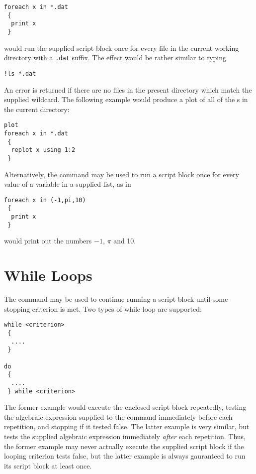 \begin{verbatim}
foreach x in *.dat
 {
  print x
 }
\end{verbatim}

\noindent would run the supplied script block once for every file in the
current working directory with a {\tt .dat} suffix. The effect would be rather
similar to typing

\begin{verbatim}
!ls *.dat
\end{verbatim}

An error is returned if there are no files in the present directory which match
the supplied wildcard. The following example would produce a plot of all of the
\datafile s in the current directory:

\begin{verbatim}
plot
foreach x in *.dat
 {
  replot x using 1:2
 }
\end{verbatim}

Alternatively, the  command may be used to run a script block
once for every value of a variable in a supplied list, as in

\begin{verbatim}
foreach x in (-1,pi,10)
 {
  print x
 }
\end{verbatim}

\noindent would print out the numbers $-1$, $\pi$ and 10.

\section{While Loops}

The  command may be used to continue running a script block
until some stopping criterion is met. Two types of while loop are supported:

\begin{verbatim}
while <criterion>
 {
  ....
 }

do
 {
  ....
 } while <criterion>
\end{verbatim}

The former example would execute the enclosed script block repeatedly, testing
the algebraic expression supplied to the  command immediately
before each repetition, and stopping if it tested false. The latter example is
very similar, but tests the supplied algebraic expression immediately {\it
after} each repetition. Thus, the former example may never actually execute the
supplied script block if the looping criterion tests false, but the latter
example is always gauranteed to run its script block at least once.

